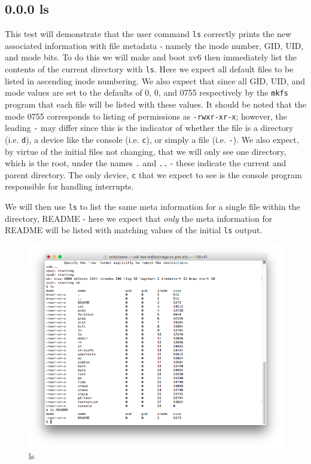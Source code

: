 \documentclass[11pt,letterpaper]{report}
\begin{document}
		\subsection*{0.0.0 ls}
		This test will demonstrate that the user command {\tt ls} correctly prints the new associated information with file metadata - namely the inode number, GID, UID, and mode bits. To do 
		this we will make and boot xv6 then immediately list the contents of the current directory with {\tt ls}. Here we expect all default files to be listed in ascending inode numbering. We also
		expect that since all GID, UID, and mode values are set to the defaults of 0, 0, and 0755 respectively by the {\tt mkfs} program that each file will be listed with these values. It should be 
		noted that the mode 0755 corresponds to listing of permissions as {\tt -rwxr-xr-x}; however, the leading {\tt -} may differ since this is the indicator of whether the file is a directory (i.e. {\tt d}),
		a device like the console (i.e. {\tt c}), or simply a file (i.e. {\tt -}). We also expect, by virtue of the initial files not changing, that we will only see one directory, which is the root, under the
		names {\tt .} and {\tt ..} - these indicate the current and parent directory. The only device, {\tt c} that we expect to see is the console program responsible for handling interrupts.
		
		We will then use {\tt ls} to list the same meta information for a single file within the directory, README - here we expect that \emph{only} the meta information for README 
		will be listed with matching values of the initial {\tt ls} output. 
		
\begin{figure}[h!]
\centering
\includegraphics[width=0.8\linewidth]{ls.png}
\caption{ls}
\label{fig:datetest}
\end{figure}	 
\end{document}
